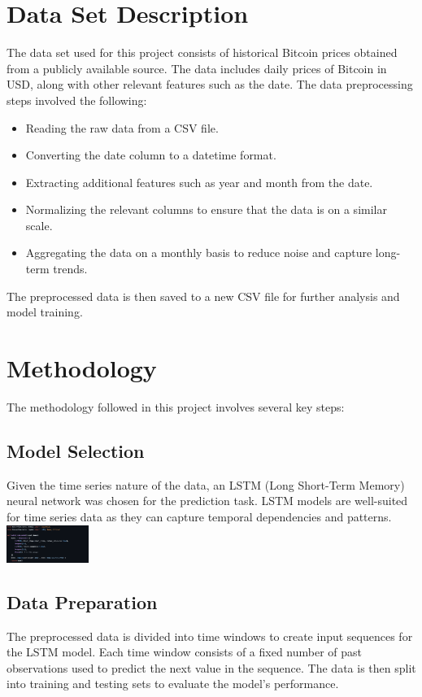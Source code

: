 \documentclass{article}
\begin{document}
\section{Data Set Description}
The data set used for this project consists of historical Bitcoin prices obtained from a publicly available source. The data includes daily prices of Bitcoin in USD, along with other relevant features such as the date. The data preprocessing steps involved the following:
\begin{itemize}
    \item Reading the raw data from a CSV file.
    \item Converting the date column to a datetime format.
    \item Extracting additional features such as year and month from the date.
    \item Normalizing the relevant columns to ensure that the data is on a similar scale.
    \item Aggregating the data on a monthly basis to reduce noise and capture long-term trends.
\end{itemize}
The preprocessed data is then saved to a new CSV file for further analysis and model training.

\section{Methodology}
The methodology followed in this project involves several key steps:
\subsection{Model Selection}
Given the time series nature of the data, an LSTM (Long Short-Term Memory) neural network was chosen for the prediction task. LSTM models are well-suited for time series data as they can capture temporal dependencies and patterns.
\includegraphics[width=0.2\textwidth]{img/model}

\subsection{Data Preparation}
The preprocessed data is divided into time windows to create input sequences for the LSTM model. Each time window consists of a fixed number of past observations used to predict the next value in the sequence. The data is then split into training and testing sets to evaluate the model's performance.
\end{document}
